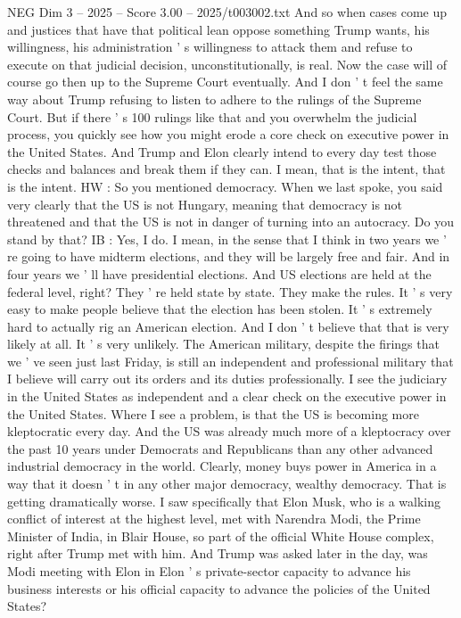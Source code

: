 \begin{textsample}{NEG Dim 3 – 2025 – Score 3.00 – 2025/t003002.txt}
And so when cases come up and justices that have that political lean oppose something Trump wants, his willingness, his administration ' s willingness to attack them and refuse to execute on that judicial decision, unconstitutionally, is real.
Now the case will of course go then up to the Supreme Court eventually.
And I don ' t feel the same way about Trump refusing to listen to adhere to the rulings of the Supreme Court.
But if there ' s 100 rulings like that and you overwhelm the judicial process, you quickly see how you might erode a core check on executive power in the United States.
And Trump and Elon clearly intend to every day test those checks and balances and break them if they can.
I mean, that is the intent, that is the intent.
HW : So you mentioned democracy.
When we last spoke, you said very clearly that the US is not Hungary, meaning that democracy is not threatened and that the US is not in danger of turning into an autocracy.
Do you stand by that?
IB : Yes, I do.
I mean, in the sense that I think in two years we ' re going to have midterm elections, and they will be largely free and fair.
And in four years we ' ll have presidential elections.
And US elections are held at the federal level, right?
They ' re held state by state.
They make the rules.
It ' s very easy to make people believe that the election has been stolen.
It ' s extremely hard to actually rig an American election.
And I don ' t believe that that is very likely at all.
It ' s very unlikely.
The American military, despite the firings that we ' ve seen just last Friday, is still an independent and professional military that I believe will carry out its orders and its duties professionally.
I see the judiciary in the United States as independent and a clear check on the executive power in the United States.
Where I see a problem, is that the US is becoming more kleptocratic every day.
And the US was already much more of a kleptocracy over the past 10 years under Democrats and Republicans than any other advanced industrial democracy in the world.
Clearly, money buys power in America in a way that it doesn ' t in any other major democracy, wealthy democracy.
That is getting dramatically worse.
I saw specifically that Elon Musk, who is a walking conflict of interest at the highest level, met with Narendra Modi, the Prime Minister of India, in Blair House, so part of the official White House complex, right after Trump met with him.
And Trump was asked later in the day, was Modi meeting with Elon in Elon ' s private-sector capacity to advance his business interests or his official capacity to advance the policies of the United States?

\end{textsample}
